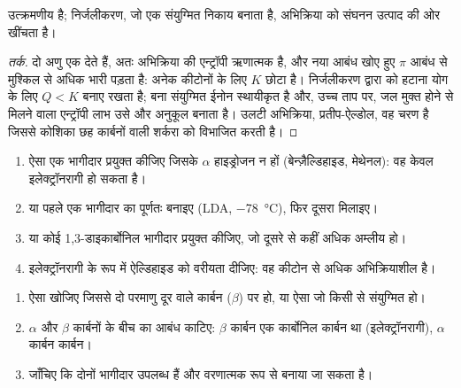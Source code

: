 \begin{proposition}[ऐल्डोल को आगे बढ़ाना]\label{prop:b2:enolates-aldol:aldol-equilibrium}
 उत्क्रमणीय है; निर्जलीकरण, जो एक संयुग्मित निकाय बनाता है,
अभिक्रिया को संघनन उत्पाद की ओर खींचता है।
\end{proposition}

\begin{proof}[तर्क]
दो अणु एक देते हैं, अतः अभिक्रिया की एन्ट्रॉपी ऋणात्मक है, और नया  आबंध खोए हुए
 $\pi$ आबंध से मुश्किल से अधिक भारी पड़ता है: अनेक कीटोनों के लिए $K$ छोटा है। निर्जलीकरण द्वारा  को हटाना
योग के लिए $Q < K$ बनाए रखता है; बना संयुग्मित ईनोन स्थायीकृत है और, उच्च ताप पर,
जल मुक्त होने से मिलने वाला एन्ट्रॉपी लाभ उसे और अनुकूल बनाता है। उलटी अभिक्रिया, प्रतीप-ऐल्डोल, वह
चरण है जिससे कोशिका छह कार्बनों वाली शर्करा को विभाजित करती है।
\end{proof}

\begin{method}[संकर ऐल्डोल का नियंत्रण]\label{met:b2:enolates-aldol:crossed-aldol}
\begin{enumerate}
  \item ऐसा एक भागीदार प्रयुक्त कीजिए जिसके $\alpha$ हाइड्रोजन न हों (बेन्ज़ैल्डिहाइड, मेथेनल): वह केवल
        इलेक्ट्रॉनरागी हो सकता है।
  \item या पहले एक भागीदार का  पूर्णतः बनाइए (LDA, \qty{-78}{\degreeCelsius}), फिर
        दूसरा मिलाइए।
  \item या कोई 1,3-डाइकार्बोनिल भागीदार प्रयुक्त कीजिए, जो दूसरे से कहीं अधिक अम्लीय हो।
  \item इलेक्ट्रॉनरागी के रूप में ऐल्डिहाइड को वरीयता दीजिए: वह कीटोन से अधिक अभिक्रियाशील है।
\end{enumerate}
\end{method}

\begin{method}[ऐल्डोल उत्पाद की पहचान]\label{met:b2:enolates-aldol:aldol-recognition}
\begin{enumerate}
  \item ऐसा  खोजिए जिससे दो परमाणु दूर वाले कार्बन ($\beta$) पर  हो, या ऐसा 
        जो किसी  से संयुग्मित हो।
  \item $\alpha$ और $\beta$ कार्बनों के बीच का आबंध काटिए: $\beta$ कार्बन एक कार्बोनिल कार्बन था (इलेक्ट्रॉनरागी),
        $\alpha$ कार्बन  कार्बन।
  \item जाँचिए कि दोनों भागीदार उपलब्ध हैं और  वरणात्मक रूप से बनाया जा सकता है।
\end{enumerate}
\end{method}

